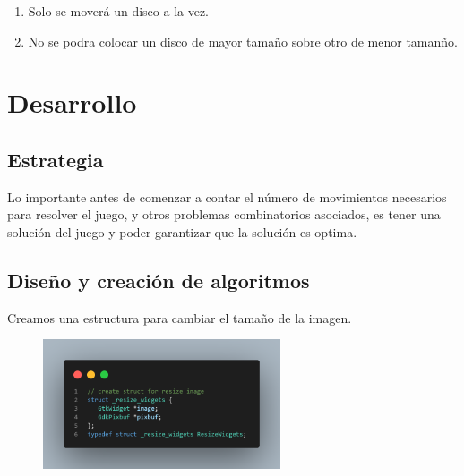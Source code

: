 \documentclass[letterpaper,12pt]{extarticle}%
\begin{document}
\begin{multicols}{2}
\begin{enumerate}
		\item Solo se moverá un disco a la vez.

		\item No se podra colocar un disco de mayor tamaño sobre otro de menor tamanño.
	
	\end{enumerate} 

    
		
	\section{Desarrollo}
	\subsection{Estrategia}
		Lo importante antes de comenzar a contar el número de movimientos necesarios
		para resolver el juego, y otros problemas combinatorios asociados, es tener
		una solución del juego y poder garantizar que la solución es optima.
	\subsection{Diseño y creación de algoritmos}
		Creamos una estructura para cambiar el tamaño de la imagen.
	

		\begin{figure}[H]
		\begin{center}
		\includegraphics[width=7cm]{imag//img1.png}
		\caption{}
		\label{ProgramDesign}
		\end{center}
 		\end{figure}
		

\end{multicols}
\end{document}
